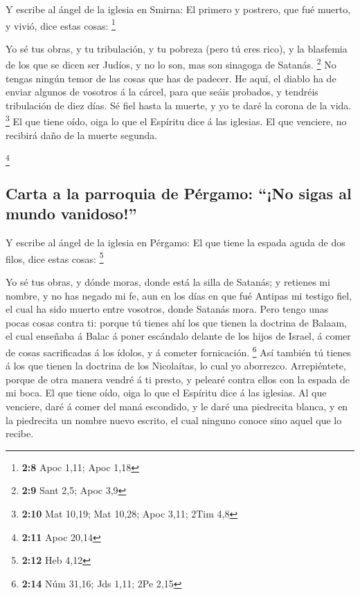  Y escribe al ángel de la iglesia en Smirna: El primero y
postrero, que fué muerto, y vivió, dice estas cosas: \footnote{\textbf{2:8}
  Apoc 1,11; Apoc 1,18}

 Yo sé tus obras, y tu tribulación, y tu pobreza (pero tú
eres rico), y la blasfemia de los que se dicen ser Judíos, y no lo son,
mas son sinagoga de Satanás. \footnote{\textbf{2:9} Sant 2,5; Apoc 3,9}
 No tengas ningún temor de las cosas que has de padecer. He
aquí, el diablo ha de enviar algunos de vosotros á la cárcel, para que
seáis probados, y tendréis tribulación de diez días. Sé fiel hasta la
muerte, y yo te daré la corona de la vida. \footnote{\textbf{2:10} Mat
  10,19; Mat 10,28; Apoc 3,11; 2Tim 4,8}  El que tiene
oído, oiga lo que el Espíritu dice á las iglesias. El que venciere, no
recibirá daño de la muerte segunda.

\footnote{\textbf{2:11} Apoc 20,14}

\hypertarget{carta-a-la-parroquia-de-puxe9rgamo-no-sigas-al-mundo-vanidoso}{%
\subsection{Carta a la parroquia de Pérgamo: ``¡No sigas al mundo
vanidoso!''}\label{carta-a-la-parroquia-de-puxe9rgamo-no-sigas-al-mundo-vanidoso}}

 Y escribe al ángel de la iglesia en Pérgamo: El que tiene
la espada aguda de dos filos, dice estas cosas: \footnote{\textbf{2:12}
  Heb 4,12}

 Yo sé tus obras, y dónde moras, donde está la silla de
Satanás; y retienes mi nombre, y no has negado mi fe, aun en los días en
que fué Antipas mi testigo fiel, el cual ha sido muerto entre vosotros,
donde Satanás mora.  Pero tengo unas pocas cosas contra ti:
porque tú tienes ahí los que tienen la doctrina de Balaam, el cual
enseñaba á Balac á poner escándalo delante de los hijos de Israel, á
comer de cosas sacrificadas á los ídolos, y á cometer fornicación.
\footnote{\textbf{2:14} Núm 31,16; Jds 1,11; 2Pe 2,15}  Así
también tú tienes á los que tienen la doctrina de los Nicolaítas, lo
cual yo aborrezco.  Arrepiéntete, porque de otra manera
vendré á ti presto, y pelearé contra ellos con la espada de mi boca.
 El que tiene oído, oiga lo que el Espíritu dice á las
iglesias. Al que venciere, daré á comer del maná escondido, y le daré
una piedrecita blanca, y en la piedrecita un nombre nuevo escrito, el
cual ninguno conoce sino aquel que lo recibe.

